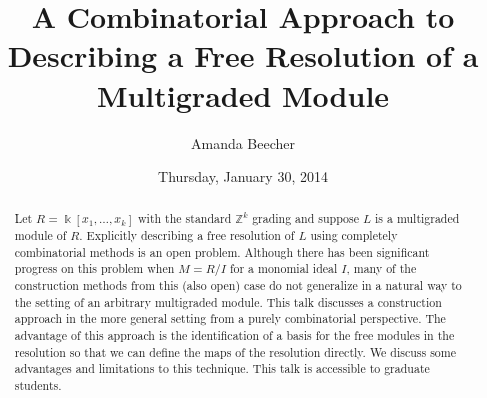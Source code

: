 \documentclass{UAmathtalk}
\author{Amanda Beecher}
\title{A Combinatorial Approach to Describing a Free Resolution of a Multigraded Module}
\date{Thursday, January 30, 2014}
\begin{document}
\maketitle

\begin{abstract}
Let $R=\Bbbk [x_1, \ldots , x_k]$ with the standard $\mathbb{Z}^k$ grading and suppose $L$ is a multigraded module of $R$.
Explicitly describing a free resolution of $L$ using completely combinatorial methods is an open problem.
Although there has been significant progress on this problem when $M=R/I$ for a monomial ideal $I$, many of the construction methods from this (also open) case do not generalize in a natural way to the setting of an arbitrary multigraded module.
This talk discusses a construction approach in the more general setting from a purely combinatorial perspective.
The advantage of this approach is the identification of a basis for the free modules in the resolution so that we can define the maps of the resolution directly.
We discuss some advantages and limitations to this technique.
This talk is accessible to graduate students.
\end{abstract}
\end{document}
